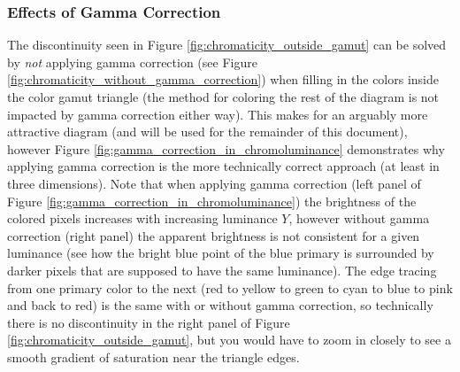 \documentclass{article}
\begin{document}
\begin{multicols}{2}
\subsubsection{Effects of Gamma Correction} %

The discontinuity seen in Figure \ref{fig:chromaticity_outside_gamut} can be solved by \textit{not} applying gamma correction (see Figure \ref{fig:chromaticity_without_gamma_correction}) when filling in the colors inside the color gamut triangle (the method for coloring the rest of the diagram is not impacted by gamma correction either way).  This makes for an arguably more attractive diagram (and will be used for the remainder of this document), however Figure \ref{fig:gamma_correction_in_chromoluminance} demonstrates why applying gamma correction is the more technically correct approach (at least in three dimensions).  Note that when applying gamma correction (left panel of Figure \ref{fig:gamma_correction_in_chromoluminance}) the brightness of the colored pixels increases with increasing luminance $Y$, however without gamma correction (right panel) the apparent brightness is not consistent for a given luminance (see how the bright blue point of the blue primary is surrounded by darker pixels that are supposed to have the same luminance).  The edge tracing from one primary color to the next (red to yellow to green to cyan to blue to pink and back to red) is the same with or without gamma correction, so technically there is no discontinuity in the right panel of Figure \ref{fig:chromaticity_outside_gamut}, but you would have to zoom in closely to see a smooth gradient of saturation near the triangle edges.


\end{multicols}
\end{document}
